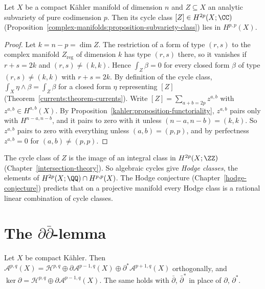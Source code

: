 \begin{proposition}\label{kahler:proposition-cycle-classes-type}
Let $X$ be a compact K\"ahler manifold of dimension $n$ and $Z \subseteq X$ an analytic subvariety of pure codimension $p$. Then its cycle
class $[Z] \in H^{2p}(X; \CC)$ (Proposition~\ref{complex-manifolds:proposition-subvariety-class}) lies in $H^{p,p}(X)$.
\end{proposition}

\begin{proof}
Let $k = n - p = \dim Z$. The restriction of a form of type $(r,s)$ to the complex manifold $Z_{\mathrm{reg}}$ of dimension $k$ has type
$(r,s)$ there, so it vanishes if $r + s = 2k$ and $(r,s) \neq (k,k)$. Hence $\int_Z\beta = 0$ for every closed form $\beta$ of type
$(r,s) \neq (k,k)$ with $r + s = 2k$. By definition of the cycle class, $\int_X\eta \wedge \beta = \int_Z\beta$ for a closed form $\eta$
representing $[Z]$ (Theorem~\ref{currents:theorem-currents}). Write $[Z] = \sum_{a+b=2p}z^{a,b}$ with $z^{a,b} \in H^{a,b}(X)$. By
Proposition~\ref{kahler:proposition-functoriality}, $z^{a,b}$ pairs only with $H^{n-a,n-b}$, and it pairs to zero with it
unless $(n-a, n-b) = (k,k)$. So $z^{a,b}$ pairs to zero with everything unless $(a,b) = (p,p)$, and by perfectness $z^{a,b} = 0$ for
$(a,b) \neq (p,p)$.
\end{proof}

\begin{remark}\label{kahler:remark-hodge-classes}
The cycle class of $Z$ is the image of an integral class in $H^{2p}(X; \ZZ)$ (Chapter~\ref{intersection-theory}). So algebraic cycles give
\emph{Hodge classes}, the elements of $H^{2p}(X; \QQ) \cap H^{p,p}(X)$. The Hodge conjecture (Chapter~\ref{hodge-conjecture}) predicts that
on a projective manifold every Hodge class is a rational linear combination of cycle classes.
\end{remark}

\section{The $\partial\bar\partial$-lemma}\label{kahler:section-ddbar-lemma}

\begin{lemma}\label{kahler:lemma-del-hodge}
Let $X$ be compact K\"ahler. Then
$\mathcal{A}^{p,q}(X) = \mathcal{H}^{p,q} \oplus \partial\mathcal{A}^{p-1,q}(X) \oplus \partial^*\mathcal{A}^{p+1,q}(X)$ orthogonally, and
$\ker\partial = \mathcal{H}^{p,q} \oplus \partial\mathcal{A}^{p-1,q}(X)$. The same holds with $\bar\partial$, $\bar\partial^*$ in place of
$\partial$, $\partial^*$.
\end{lemma}

